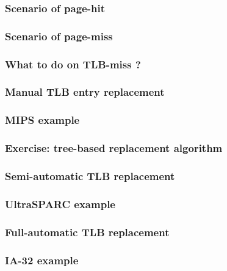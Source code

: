 
\begin{frame}
  \frametitle{Scenario of page-hit}

\end{frame}


\begin{frame}
  \frametitle{Scenario of page-miss}

\end{frame}


\begin{frame}
  \frametitle{What to do on TLB-miss ?}

\end{frame}


\begin{frame}
  \frametitle{Manual TLB entry replacement}

\end{frame}


\begin{frame}
  \frametitle{MIPS example}

\end{frame}


\begin{frame}
  \frametitle{Exercise: tree-based replacement algorithm}

\end{frame}


\begin{frame}
  \frametitle{Semi-automatic TLB replacement}

\end{frame}


\begin{frame}
  \frametitle{UltraSPARC example}

\end{frame}


\begin{frame}
  \frametitle{Full-automatic TLB replacement}

\end{frame}


\begin{frame}
  \frametitle{IA-32 example}

\end{frame}

